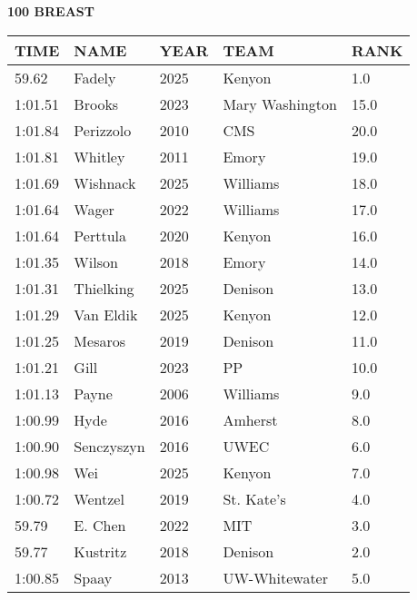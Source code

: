 \begin{minipage}[t]{0.48\textwidth}
\centering
\textbf{100 BREAST}\\[0.05cm]
\begin{tabular}{@{}p{1.8cm}p{2.8cm}p{1.2cm}p{1.4cm}p{0.8cm}@{}}
\hline
\textbf{TIME} & \textbf{NAME} & \textbf{YEAR} & \textbf{TEAM} & \textbf{RANK} \\
\hline
59.62 & Fadely & 2025 & Kenyon & 1.0 \\
1:01.51 & Brooks & 2023 & Mary Washington & 15.0 \\
1:01.84 & Perizzolo & 2010 & CMS & 20.0 \\
1:01.81 & Whitley & 2011 & Emory & 19.0 \\
1:01.69 & Wishnack & 2025 & Williams & 18.0 \\
1:01.64 & Wager & 2022 & Williams & 17.0 \\
1:01.64 & Perttula & 2020 & Kenyon & 16.0 \\
1:01.35 & Wilson & 2018 & Emory & 14.0 \\
1:01.31 & Thielking & 2025 & Denison & 13.0 \\
1:01.29 & Van Eldik & 2025 & Kenyon & 12.0 \\
1:01.25 & Mesaros & 2019 & Denison & 11.0 \\
1:01.21 & Gill & 2023 & PP & 10.0 \\
1:01.13 & Payne & 2006 & Williams & 9.0 \\
1:00.99 & Hyde & 2016 & Amherst & 8.0 \\
1:00.90 & Senczyszyn & 2016 & UWEC & 6.0 \\
1:00.98 & Wei & 2025 & Kenyon & 7.0 \\
1:00.72 & Wentzel & 2019 & St. Kate's & 4.0 \\
59.79 & E. Chen & 2022 & MIT & 3.0 \\
59.77 & Kustritz & 2018 & Denison & 2.0 \\
1:00.85 & Spaay & 2013 & UW-Whitewater & 5.0 \\
\hline
\end{tabular}
\end{minipage}

\vspace{0.4cm}

